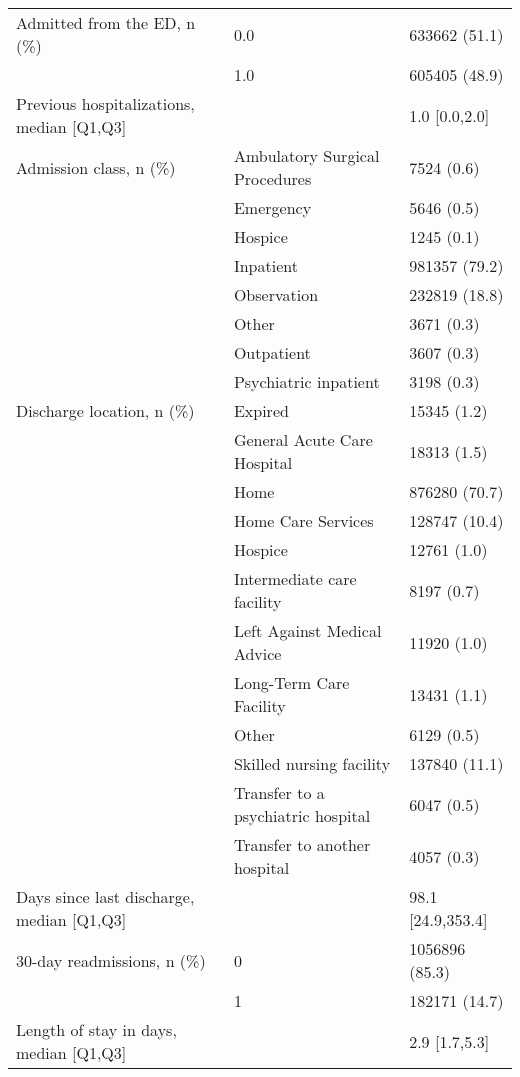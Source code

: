 \begin{tabular}{lll}
Admitted from the ED, n (\%) & 0.0 &      633662 (51.1) \\
                                       & 1.0 &      605405 (48.9) \\
Previous hospitalizations, median [Q1,Q3] &   &      1.0 [0.0,2.0] \\
Admission class, n (\%) & Ambulatory Surgical Procedures &         7524 (0.6) \\
                                       & Emergency &         5646 (0.5) \\
                                       & Hospice &         1245 (0.1) \\
                                       & Inpatient &      981357 (79.2) \\
                                       & Observation &      232819 (18.8) \\
                                       & Other &         3671 (0.3) \\
                                       & Outpatient &         3607 (0.3) \\
                                       & Psychiatric inpatient &         3198 (0.3) \\
Discharge location, n (\%) & Expired &        15345 (1.2) \\
                                       & General Acute Care Hospital &        18313 (1.5) \\
                                       & Home &      876280 (70.7) \\
                                       & Home Care Services &      128747 (10.4) \\
                                       & Hospice &        12761 (1.0) \\
                                       & Intermediate care facility &         8197 (0.7) \\
                                       & Left Against Medical Advice &        11920 (1.0) \\
                                       & Long-Term Care Facility &        13431 (1.1) \\
                                       & Other &         6129 (0.5) \\
                                       & Skilled nursing facility &      137840 (11.1) \\
                                       & Transfer to a psychiatric hospital &         6047 (0.5) \\
                                       & Transfer to another hospital &         4057 (0.3) \\
Days since last discharge, median [Q1,Q3] &   &  98.1 [24.9,353.4] \\
30-day readmissions, n (\%) & 0 &     1056896 (85.3) \\
                                       & 1 &      182171 (14.7) \\
Length of stay in days, median [Q1,Q3] &   &      2.9 [1.7,5.3] \\
\bottomrule
\end{tabular}
